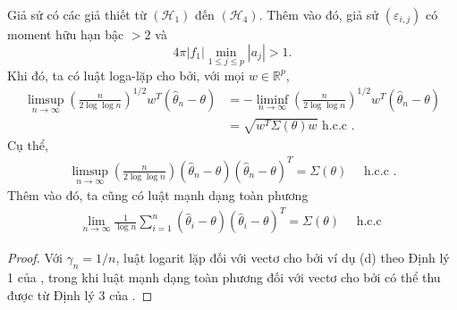 {\dl Giả sử có các giả thiết từ $\left(\mathcal{H}_{1}\right)$ đến $\left(\mathcal{H}_{4}\right)$. Thêm vào đó, giả sử $\left(\varepsilon_{i, j}\right)$ có moment hữu hạn bậc $>2$ và
$$
4 \pi\left|f_{1}\right| \min _{1 \leq j \leq p}\left|a_{j}\right|>1.
$$
Khi đó, ta có luật loga-lặp cho bởi, với mọi $w \in \mathbb{R}^{p}$,
$$
\begin{aligned}
\limsup _{n \rightarrow \infty}\left(\frac{n}{2 \log \log n}\right)^{1 / 2} w^{T}\left(\widehat{\theta}_{n}-\theta\right) & =-\liminf _{n \rightarrow \infty}\left(\frac{n}{2 \log \log n}\right)^{1 / 2} w^{T}\left(\widehat{\theta}_{n}-\theta\right) \\
& =\sqrt{w^{T} \Sigma(\theta) w} \text { h.c.c .}
\end{aligned}
\label{4.10}
$$
Cụ thể,
\begin{align}
    \limsup _{n \rightarrow \infty}\left(\frac{n}{2 \log \log n}\right)\left(\widehat{\theta}_{n}-\theta\right)\left(\widehat{\theta}_{n}-\theta\right)^{T}=\Sigma(\theta) \quad \text { h.c.c .}
    \label{4.11}
\end{align}
Thêm vào đó, ta cũng có luật mạnh dạng toàn phương
\begin{align}
    \lim _{n \rightarrow \infty} \frac{1}{\log n} \sum_{i=1}^{n}\left(\widehat{\theta}_{i}-\theta\right)\left(\widehat{\theta}_{i}-\theta\right)^{T}=\Sigma(\theta) \quad \text { h.c.c }
    \label{4.12}
\end{align}
\begin{proof}
     Với $\gamma_n = 1/n$, luật logarit lặp đối với vectơ cho bởi ví dụ (d) theo Định lý 1 của \cite{pelletier_on_the_almost}, trong khi luật mạnh dạng toàn phương đối với vectơ cho bởi  có thể thu được từ Định lý 3 của \cite{pelletier_on_the_almost}.
\end{proof}
}

